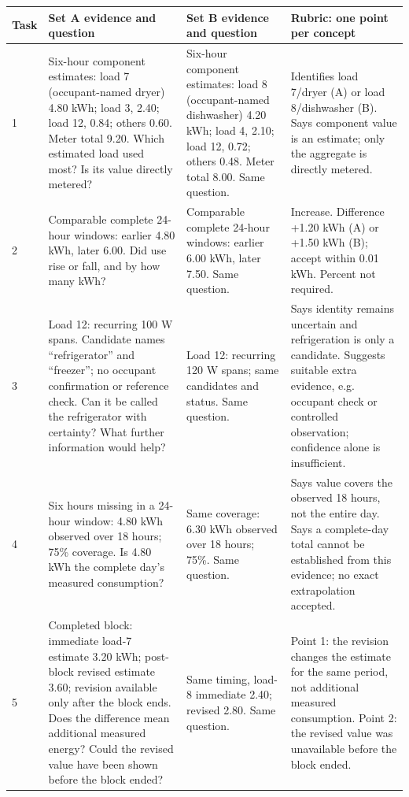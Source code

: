 \documentclass[11pt,letterpaper]{article}
\begin{document}
\begin{longtable}{L{1.1cm}L{4.4cm}L{4.4cm}L{4.4cm}}
\toprule
Task & Set A evidence and question & Set B evidence and question & Rubric: one point per concept\\
\midrule
{} & Six-hour component estimates: load 7 (occupant-named dryer) 4.80 kWh; load 3, 2.40; load 12, 0.84; others 0.60. Meter total 9.20. Which estimated load used most? Is its value directly metered? & Six-hour component estimates: load 8 (occupant-named dishwasher) 4.20 kWh; load 4, 2.10; load 12, 0.72; others 0.48. Meter total 8.00. Same question. & Identifies load 7/dryer (A) or load 8/dishwasher (B). Says component value is an estimate; only the aggregate is directly metered.\\
2 & Comparable complete 24-hour windows: earlier 4.80 kWh, later 6.00. Did use rise or fall, and by how many kWh? & Comparable complete 24-hour windows: earlier 6.00 kWh, later 7.50. Same question. & Increase. Difference +1.20 kWh (A) or +1.50 kWh (B); accept within 0.01 kWh. Percent not required.\\
3 & Load 12: recurring 100 W spans. Candidate names ``refrigerator'' and ``freezer''; no occupant confirmation or reference check. Can it be called the refrigerator with certainty? What further information would help? & Load 12: recurring 120 W spans; same candidates and status. Same question. & Says identity remains uncertain and refrigeration is only a candidate. Suggests suitable extra evidence, e.g. occupant check or controlled observation; confidence alone is insufficient.\\
4 & Six hours missing in a 24-hour window: 4.80 kWh observed over 18 hours; 75\% coverage. Is 4.80 kWh the complete day's measured consumption? & Same coverage: 6.30 kWh observed over 18 hours; 75\%. Same question. & Says value covers the observed 18 hours, not the entire day. Says a complete-day total cannot be established from this evidence; no exact extrapolation accepted.\\
5 & Completed block: immediate load-7 estimate 3.20 kWh; post-block revised estimate 3.60; revision available only after the block ends. Does the difference mean additional measured energy? Could the revised value have been shown before the block ended? & Same timing, load-8 immediate 2.40; revised 2.80. Same question. & Point 1: the revision changes the estimate for the same period, not additional measured consumption. Point 2: the revised value was unavailable before the block ended.\\

\end{longtable}
\end{document}
